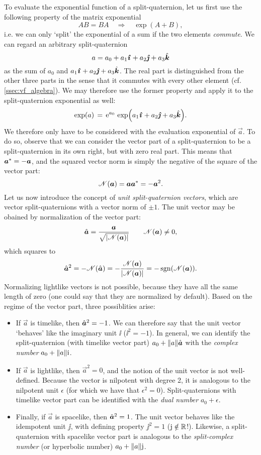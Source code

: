 To evaluate the exponential function of a split-quaternion, let us first use the following property of the matrix exponential \cite{Hall2013}
$$ AB = BA \quad \Rightarrow \quad \exp(A + B), $$
i.e. we can only `split' the exponential of a sum if the two elements \emph{commute}. We can regard an arbitrary split-quaternion
$$ a = \quat{a_0}{a_1}{a_2}{a_3} $$
as the sum of $a_0$ and $\quatvec{a_1}{a_2}{a_3}$. The real part is distinguished from the other three parts in the sense that it commutes
with every other element (cf. \cref{ssec:vf_algebra}). We may therefore use the former property and apply it to the split-quaternion exponential as well:
$$ \exp(a) \, = \,\ec^{a_0}\,\exp(\quatvec{a_1}{a_2}{a_3}). $$
We therefore only have to be considered with the evaluation exponential of $\vec{a}$. To do so, observe that we can consider the vector part of a split-quaternion to be a split-quaternion in its own right, but with zero real part. This means that $ \conj{\vec{a}} = -\vec{a} $, and the squared vector norm is simply the negative of the square of the vector part:
$$ \mathscr{N}(\vec{a}) = \vec{a} \conj{\vec{a}} = -\vec{a}^2. $$
Let us now introduce the concept of \emph{unit split-quaternion vectors}, which are vector split-quaternions with a vector norm of $\pm 1$. The unit vector may be obained by normalization of the vector part:
$$ \hat{\vec{a}} = \frac{\vec{a}}{\sqrt{\abs{\mathscr{N}(\vec{a})}}} \qquad \mathscr{N}(\vec{a}) \neq 0, $$
which squares to
$$ \hat{\vec{a}}^2 = - \mathscr{N}(\hat{\vec{a}}) 
                   = - \frac{\mathscr{N}(\vec{a})}{\abs{\mathscr{N}(\vec{a})}} 
                   = - \sgn(\mathscr{N}(\vec{a})).
$$
Normalizing lightlike vectors is not possible, because they have all the same length of zero (one could say that they are normalized by default). Based on the regime of the vector part, three possiblities arise: \cite{Motter1998,Harkin2004}
\begin{itemize}
    \item If $\vec{a}$ is timelike, then $\uvec{a}^2 = -1$. We can therefore say that the unit vector `behaves' like the imaginary unit $\ii$ ($\ii^2 = -1$). In general, we can identify the split-quaternion (with timelike vector part) $ a_0 + \norm{a}\uvec{a}$ with the \emph{complex number} $a_0 + \norm{a}\mathrm{i}$. 
    \item If $\vec{a}$ is lightlike, then $\vec{a}^2 = 0$, and the notion of the unit vector is not well-defined. Because the vector is nilpotent with degree 2, it is analogous to the nilpotent unit $\epsilon$ (for which we have that $\epsilon^2 = 0$). Split-quaternions with timelike vector part can be identified with the \emph{dual number} $a_0 + \epsilon$. 
    \item Finally, if $\vec{a}$ is spacelike, then $\uvec{a}^2 = 1$. The unit vector behaves like the idempotent unit $\jj$, with defining property $\jj^2 = 1$ ($\mathrm{j} \notin \mathbb{R}$!). Likewise, a split-quaternion with spacelike vector part is analogous to the \emph{split-complex number} (or hyperbolic number) $a_0 + \norm{a}\mathrm{j}$.
\end{itemize}

